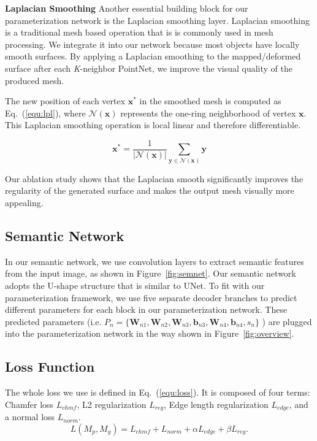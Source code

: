\noindent\textbf{Laplacian Smoothing}
Another essential building block for our parameterization network is the Laplacian smoothing layer. Laplacian smoothing is a traditional mesh based operation that is is commonly used in mesh processing. We integrate it into our network because most objects have locally smooth surfaces. By applying a Laplacian smoothing to the mapped/deformed surface after each \textit{K}-neighbor PointNet, we improve the visual quality of the produced mesh.

The new position of each vertex $\mathbf{x}^{*}$ in the smoothed mesh is computed as Eq.~(\ref{equ:lpl}), where $\mathcal{N}(\mathbf{x})$ represents the one-ring neighborhood of vertex $\mathbf{x}$. 
This Laplacian smoothing operation is local linear and therefore differentiable.

\begin{equation}
\mathbf{x}^* = \frac{1}{|\mathcal{N}(\mathbf{x})|}\sum_{\mathbf{y}\in\mathcal{N}(\mathbf{x})}\mathbf{y}
\label{equ:lpl}
\end{equation}

Our ablation study shows that the Laplacian smooth significantly improves the regularity of the generated surface and makes the output mesh visually more appealing.

\subsection{Semantic Network}
\label{subsec:semnet}
%
In our semantic network, we use convolution layers to extract semantic features from the input image, as shown in Figure~\ref{fig:semnet}.  
Our semantic network adopts the U-shape structure that is similar to UNet\cite{unet}. 
To fit with our parameterization framework, we use five separate decoder branches to predict different parameters for each block in our parameterization network. These predicted parameters (i.e. $P_n=\{\mathbf{W}_{n1},\mathbf{W}_{n2},\mathbf{W}_{n3},\mathbf{b}_{n3},\mathbf{W}_{n4},\mathbf{b}_{n4},s_{n}\}$ ) are plugged into the parameterization network in the way shown in Figure~\ref{fig:overview}.

\subsection{Loss Function}

The whole loss we use is defined in Eq.~(\ref{equ:loss}).
It is composed of four terms: Chamfer loss $L_{chmf}$, L2 regularization $L_{reg}$, Edge length regularization $L_{edge}$, and a normal loss $L_{norm}$.
\begin{equation}
\label{equ:loss}
L(M_p, M_g ) = L_{chmf} + L_{norm} +\alpha L_{edge}+ \beta L_{reg}.
\end{equation}

